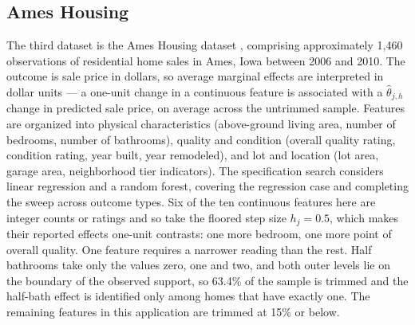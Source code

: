\documentclass[12pt]{article}
\begin{document}
	\subsection{Ames Housing}
	
	The third dataset is the Ames Housing dataset \citep{decock2011}, comprising approximately 1,460 observations of residential home sales in Ames, Iowa between 2006 and 2010. The outcome is sale price in dollars, so average marginal effects are interpreted in dollar units --- a one-unit change in a continuous feature is associated with a $\widehat{\theta}_{j,h}$ change in predicted sale price, on average across the untrimmed sample. Features are organized into physical characteristics (above-ground living area, number of bedrooms, number of bathrooms), quality and condition (overall quality rating, condition rating, year built, year remodeled), and lot and location (lot area, garage area, neighborhood tier indicators). The specification search considers linear regression and a random forest, covering the regression case and completing the sweep across outcome types. Six of the ten continuous features here are integer counts or ratings and so take the floored step size $h_j = 0.5$, which makes their reported effects one-unit contrasts: one more bedroom, one more point of overall quality. One feature requires a narrower reading than the rest. Half bathrooms take only the values zero, one and two, and both outer levels lie on the boundary of the observed support, so 63.4\% of the sample is trimmed and the half-bath effect is identified only among homes that have exactly one. The remaining features in this application are trimmed at 15\% or below.
	
\end{document}
